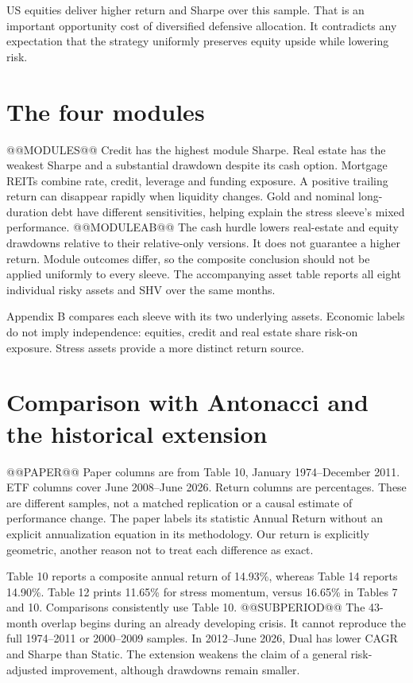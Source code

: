 \documentclass[11pt,letterpaper]{article}
\begin{document}
US equities deliver higher return and Sharpe over this sample. That is an important opportunity cost of diversified defensive allocation. It contradicts any expectation that the strategy uniformly preserves equity upside while lowering risk.

\newpage
\section{The four modules}
@@MODULES@@
Credit has the highest module Sharpe. Real estate has the weakest Sharpe and a substantial drawdown despite its cash option. Mortgage REITs combine rate, credit, leverage and funding exposure. A positive trailing return can disappear rapidly when liquidity changes. Gold and nominal long-duration debt have different sensitivities, helping explain the stress sleeve's mixed performance.
@@MODULEAB@@
The cash hurdle lowers real-estate and equity drawdowns relative to their relative-only versions. It does not guarantee a higher return. Module outcomes differ, so the composite conclusion should not be applied uniformly to every sleeve. The accompanying asset table reports all eight individual risky assets and SHV over the same months.

Appendix B compares each sleeve with its two underlying assets. Economic labels do not imply independence: equities, credit and real estate share risk-on exposure. Stress assets provide a more distinct return source.

\newpage
\section{Comparison with Antonacci and the historical extension}
@@PAPER@@
Paper columns are from Table 10, January 1974--December 2011. ETF columns cover June 2008--June 2026. Return columns are percentages. These are different samples, not a matched replication or a causal estimate of performance change. The paper labels its statistic Annual Return without an explicit annualization equation in its methodology. Our return is explicitly geometric, another reason not to treat each difference as exact.

Table 10 reports a composite annual return of 14.93\%, whereas Table 14 reports 14.90\%. Table 12 prints 11.65\% for stress momentum, versus 16.65\% in Tables 7 and 10. Comparisons consistently use Table 10.
@@SUBPERIOD@@
The 43-month overlap begins during an already developing crisis. It cannot reproduce the full 1974--2011 or 2000--2009 samples. In 2012--June 2026, Dual has lower CAGR and Sharpe than Static. The extension weakens the claim of a general risk-adjusted improvement, although drawdowns remain smaller.
\end{document}
